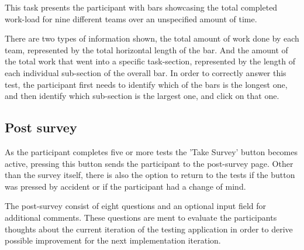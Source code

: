 {    This task presents the participant with bars showcasing the total
    completed work-load for nine different teams over an unspecified amount
    of time.

    There are two types of information shown, the total amount of work done
    by each team, represented by the total horizontal length of the bar.
    And the amount of the total work that went into a specific
    task-section, represented by the length of each individual sub-section
    of the overall bar.
    In order to correctly answer this test, the participant first needs to
    identify which of the bars is the longest one, and then identify which
    sub-section is the largest one, and click on that one.

  \newpage
  \subsection{Post survey}


    As the participant completes five or more tests the 'Take Survey'
    button becomes active, pressing this button sends the participant to
    the post-survey page. Other than the survey itself, there is also the
    option to return to the tests if the button was pressed by accident or
    if the participant had a change of mind.

    The post-survey consist of eight questions and an optional input field
    for additional comments. These questions are ment to evaluate the
    participants thoughts about the current iteration of the testing
    application in order to derive possible improvement for the next
    implementation iteration.

}
